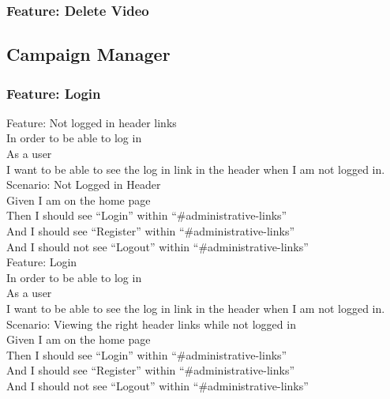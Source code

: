 \documentclass[12pt]{article}
\begin{document}
\subsubsection{Feature: Delete Video}

\subsection{Campaign Manager}

\subsubsection{Feature: Login}

\begin{hangparas}{0.25in}{1}
Feature: Not logged in header links \\
In order to be able to log in \\
As a user \\
I want to be able to see the log in link in the header when I am not logged in. \\

Scenario: Not Logged in Header  \\
Given I am on the home page \\
Then I should see ``Login'' within ``\#administrative-links'' \\
And I should see ``Register'' within ``\#administrative-links'' \\
And I should not see ``Logout'' within ``\#administrative-links'' \\

Feature: Login \\
  In order to be able to log in \\
  As a user \\
  I want to be able to see the log in link in the header when I am not logged in. \\

Scenario: Viewing the right header links while not logged in  \\
  Given I am on the home page \\
  Then I should see ``Login'' within ``\#administrative-links'' \\
  And I should see ``Register'' within ``\#administrative-links'' \\
  And I should not see ``Logout'' within ``\#administrative-links'' \\



\end{hangparas}
\end{document}
